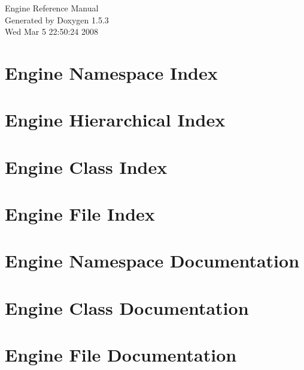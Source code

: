 \documentclass[a4paper]{book}
\begin{document}
\begin{titlepage}
\vspace*{7cm}
\begin{center}
{\Large Engine Reference Manual}\\
\vspace*{1cm}
{\large Generated by Doxygen 1.5.3}\\
\vspace*{0.5cm}
{\small Wed Mar 5 22:50:24 2008}\\
\end{center}
\end{titlepage}
\clearemptydoublepage
{}
\tableofcontents
\clearemptydoublepage
{}
\chapter{Engine Namespace Index}

\chapter{Engine Hierarchical Index}

\chapter{Engine Class Index}

\chapter{Engine File Index}

\chapter{Engine Namespace Documentation}

\chapter{Engine Class Documentation}








\chapter{Engine File Documentation}








\printindex
\end{document}
